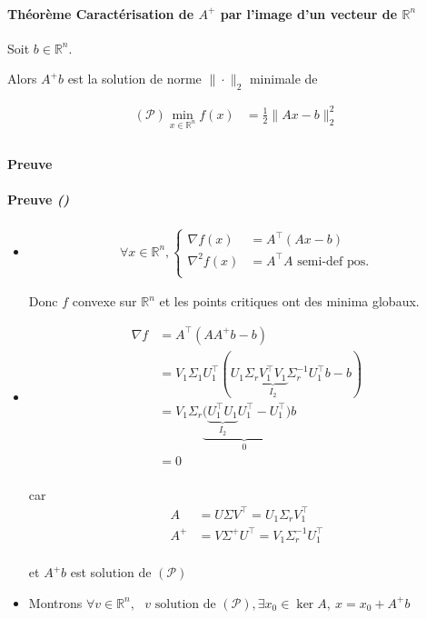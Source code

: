 \documentclass{article}
\newcommand{\cP}{\mathcal{P}}
\newcommand{\R}{\mathbb{R}}
\newenvironment{theorem}[1][\unskip]{
	\paragraph{Théorème #1}

}{}
\newenvironment{proof}[1][\unskip]{
	\def\temp{#1}\ifx\temp\empty
		\paragraph{Preuve}
	\else
		\paragraph{Preuve \emph{(#1)}}
	\fi

}{}
\begin{document}
\begin{theorem}[Caractérisation de $A^+$ par l'image d'un vecteur de $\R^n$ ]
    Soit $b\in \R^n$.

    Alors $A^{+} b$ est la solution de norme $\| \cdot \|_2$ minimale de 

    \begin{align*}
        (\cP) \min_{x \in \R^n} f(x) &= \frac{1}{2} \| Ax - b \|_2^2 \\
    \end{align*}
\end{theorem}

\begin{proof}
    \begin{itemize}
        \item \begin{align*}
            \forall x\in \R^n, \begin{cases}
               \nabla f(x) &= A^\top (Ax - b) \\
               \nabla ^2 f(x) &= A^\top A \text{ semi-def pos.} \\
            \end{cases}
        \end{align*}

        Donc $f$ convexe sur $\R^n$ et les points critiques ont des minima globaux.

        \item \begin{align*}
            \nabla f &= A^\top (A A^+b-b) \\
            &= V_1 \Sigma_1 U_1^\top (U_1 \Sigma_r \underbrace{V_1^\top V_1}_{I_2} \Sigma_r^{-1} U_1^\top b-b)  \\
            &= V_1 \Sigma_r \underbrace{(\underbrace{U_1^\top U_1}_{I_2} U_1^\top - U_1^\top }_{0})b \\
            &= 0 \\
        \end{align*}

        car \begin{align*}
            A &= U\Sigma V^\top = U_1 \Sigma_r V_1^\top \\
            A^+ &= V \Sigma^+ U^\top = V_1 \Sigma_r^{-1} U_1^\top  \\
        \end{align*}

        et $A^+ b$ est solution de $(\cP)$

        \item Montrons $\forall v \in \R^n,\text{ $v$ solution de $(\cP)$}, \exists x_0 \in \ker A,\ x=x_0 + A^+ b$


\end{itemize}
\end{proof}
\end{document}

